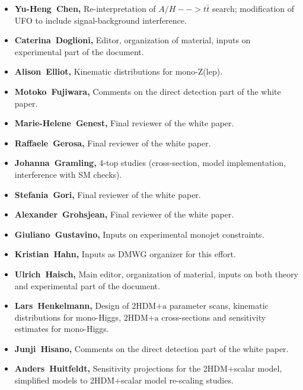 \documentclass[a4paper, 11pt,notoc]{article}
\newcommand{\hdma}{\ensuremath{\textrm{2HDM+a}}\xspace}
\begin{document}
\begin{itemize}
\item \textbf{Yu-Heng~Chen,} Re-interpretation of $A/H-->t\bar{t}$ search; modification of UFO to include signal-background interference.

\item \textbf{Caterina~Doglioni,} Editor, organization of material, inputs on experimental part of the document. 

\item \textbf{Alison~Elliot,} Kinematic distributions for mono-Z(lep). 

\item \textbf{Motoko~Fujiwara,} Comments on the direct detection part of the white paper. 

\item \textbf{Marie-Helene~Genest,} Final reviewer of the white paper. 

\item \textbf{Raffaele~Gerosa,} Final reviewer of the white paper. 

\item \textbf{Johanna~Gramling,} 4-top studies (cross-section, model implementation, interference with SM checks).

\item \textbf{Stefania~Gori,} Final reviewer of the white paper. 

\item \textbf{Alexander~Grohsjean,} Final reviewer of the white paper. 

\item \textbf{Giuliano~Gustavino,} Inputs on experimental monojet constraints. 

\item \textbf{Kristian~Hahn,} Inputs as DMWG organizer for this effort. 

\item \textbf{Ulrich~Haisch,} Main editor, organization of material, inputs on both theory and experimental part of the document. 
 
\item \textbf{Lars~Henkelmann,} Design of \hdma parameter scans,  kinematic distributions for mono-Higgs, \hdma cross-sections and sensitivity estimates for mono-Higgs.

\item \textbf{Junji~Hisano,} Comments on the direct detection part of the white paper. 

\item \textbf{Anders~Huitfeldt,} Sensitivity projections for the 2HDM+scalar model, simplified models to 2HDM+scalar model re-scaling studies. 


\end{itemize}
\end{document}
